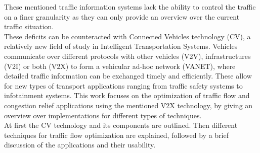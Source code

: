 \documentclass{sig-alternate}
\begin{document}
These mentioned traffic information systems lack the ability to control the traffic on a finer granularity as they can only provide an overview over the current traffic situation. \\
These deficits can be counteracted with Connected Vehicles technology (CV), a relatively new field of study in Intelligent Transportation Systems. Vehicles communicate over different protocols with other vehicles (V2V), infrastructures (V2I) or both (V2X) to form a vehicular ad-hoc network (VANET), where detailed traffic information can be exchanged timely and efficiently. These allow for new types of transport applications ranging from traffic safety systems to infotainment systems. This work focuses on the optimization of traffic flow and congestion relief applications using the mentioned V2X technology, by giving an overview over implementations for different types of techniques.   \\
At first the CV technology and its components are outlined. Then different techniques for traffic flow optimization are explained, followed by a brief discussion of the applications and their usability.  
\end{document}
